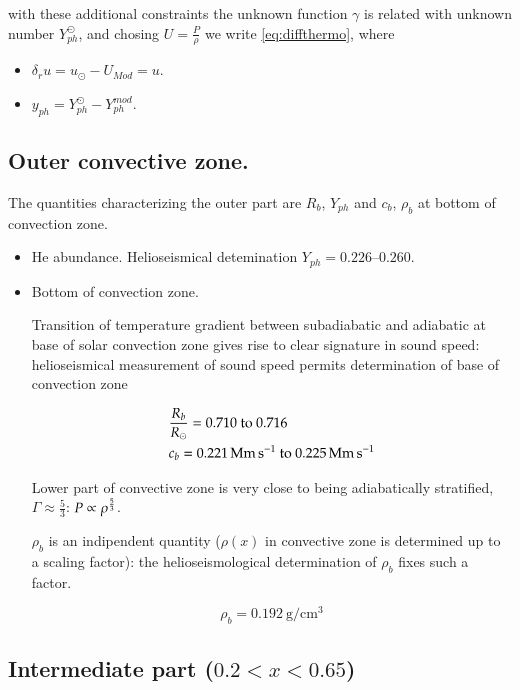 \documentclass[oneside,12pt]{memoir}
\begin{document}
with these additional constraints the unknown function $\gamma$ is related with unknown number $Y_{ph}^{\odot}$, and chosing $U=\frac{P}{\rho}$ we write \autoref{eq:diffthermo}, where
\begin{itemize}
    \item $\delta_ru=u_{\odot}-U_{Mod}=u$.
    \item $y_{ph}=Y_{ph}^{\odot}-Y_{ph}^{mod}$.
\end{itemize}

\subsection{Outer convective zone.}

The quantities characterizing the outer part are $R_b$, $Y_{ph}$ and $c_b$, $\rho_b$ at bottom of convection zone.

\begin{itemize}
    \item He abundance. Helioseismical detemination $Y_{ph}=\numrange{0.226}{0.260}$.
    
    \item Bottom of convection zone.
    
    Transition of temperature gradient between subadiabatic and adiabatic at base of solar convection zone gives rise to clear signature in sound speed: helioseismical measurement of sound speed permits determination of base of convection zone
    
    \begin{align*}
    &\frac{R_b}{\rsun{}}=\numrange{0.710}{0.716}\\
    &c_b=\SIrange{0.221}{0.225}{\mega\meter\per\second}
    \end{align*}
    
    Lower part of convective zone is very close to being adiabatically stratified, $\Gamma\approx\frac{5}{3}$: $P\propto\rho^{\frac{5}{3}}$.
    
    $\rho_b$ is an indipendent quantity ($\rho(x)$ in convective zone is determined up to a scaling factor): the helioseismological determination of $\rho_b$ fixes such a factor.
    
    \begin{equation*}
        \rho_b=\SI{0.192}{\gram\per\cubic\cm}
    \end{equation*}
    
\end{itemize}

\subsection{Intermediate part ($0.2<x<0.65$)}
\end{document}
